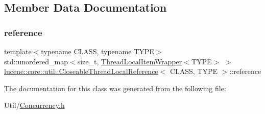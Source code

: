 \subsection{Member Data Documentation}
\mbox{\label{classlucene_1_1core_1_1util_1_1CloseableThreadLocalReference_a1df112eff02d74eb49b69c548c197a5f}} 
\subsubsection{\texorpdfstring{reference}{reference}}
{\footnotesize\ttfamily template$<$typename C\+L\+A\+SS, typename T\+Y\+PE$>$ \\
std\+::unordered\+\_\+map$<$size\+\_\+t, \mbox{\hyperlink{classlucene_1_1core_1_1util_1_1ThreadLocalItemWrapper}{Thread\+Local\+Item\+Wrapper}}$<$T\+Y\+PE$>$ $>$ \mbox{\hyperlink{classlucene_1_1core_1_1util_1_1CloseableThreadLocalReference}{lucene\+::core\+::util\+::\+Closeable\+Thread\+Local\+Reference}}$<$ C\+L\+A\+SS, T\+Y\+PE $>$\+::reference\hspace{0.3cm}{\ttfamily [private]}}



The documentation for this class was generated from the following file\+:\begin{DoxyCompactItemize}
\item 
Util/\mbox{\hyperlink{Concurrency_8h}{Concurrency.\+h}}\end{DoxyCompactItemize}
